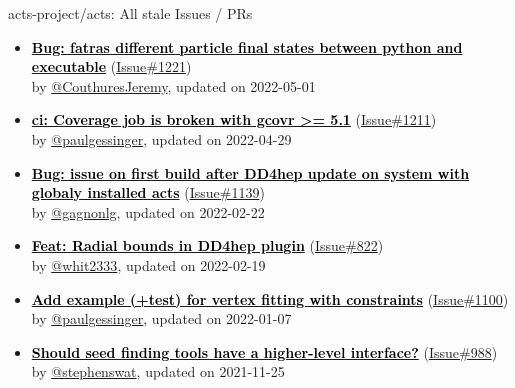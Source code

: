 \documentclass{beamer}
\begin{document}
\begin{frame}[allowframebreaks]{ acts-project/acts: All stale Issues / PRs}
\begin{itemize}
    \item
    \textbf{\href{https://github.com/acts-project/acts/issues/1221}{\textcolor{black}{Bug: fatras different particle final states between python and executable}}}
    (\href{https://github.com/acts-project/acts/issues/1221}{Issue\#1221}) \\
    by \href{https://github.com/CouthuresJeremy}{ @CouthuresJeremy}, updated on 2022-05-01

    \item
    \textbf{\href{https://github.com/acts-project/acts/issues/1211}{\textcolor{black}{ci: Coverage job is broken with gcovr >= 5.1}}}
    (\href{https://github.com/acts-project/acts/issues/1211}{Issue\#1211}) \\
    by \href{https://github.com/paulgessinger}{ @paulgessinger}, updated on 2022-04-29

    \item
    \textbf{\href{https://github.com/acts-project/acts/issues/1139}{\textcolor{black}{Bug: issue on first build after DD4hep update on system with globaly installed acts}}}
    (\href{https://github.com/acts-project/acts/issues/1139}{Issue\#1139}) \\
    by \href{https://github.com/gagnonlg}{ @gagnonlg}, updated on 2022-02-22

    \item
    \textbf{\href{https://github.com/acts-project/acts/issues/822}{\textcolor{black}{Feat: Radial bounds in DD4hep plugin}}}
    (\href{https://github.com/acts-project/acts/issues/822}{Issue\#822}) \\
    by \href{https://github.com/whit2333}{ @whit2333}, updated on 2022-02-19

    \item
    \textbf{\href{https://github.com/acts-project/acts/issues/1100}{\textcolor{black}{Add example (+test) for vertex fitting with constraints}}}
    (\href{https://github.com/acts-project/acts/issues/1100}{Issue\#1100}) \\
    by \href{https://github.com/paulgessinger}{ @paulgessinger}, updated on 2022-01-07

    \item
    \textbf{\href{https://github.com/acts-project/acts/issues/988}{\textcolor{black}{Should seed finding tools have a higher-level interface?}}}
    (\href{https://github.com/acts-project/acts/issues/988}{Issue\#988}) \\
    by \href{https://github.com/stephenswat}{ @stephenswat}, updated on 2021-11-25


\end{itemize}
\end{frame}
\end{document}
